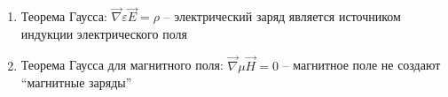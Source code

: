 \documentclass[12pt]{article}
\begin{document}
\begin{enumerate}[label*=\arabic** ]
\begin{enumerate}
            \item Теорема Гаусса: $\vec\nabla \varepsilon \vec{E} = \rho$ -- электрический заряд является источником индукции электрического поля

            \item Теорема Гаусса для магнитного поля: $\vec\nabla \mu \vec{H} = 0$ -- магнитное поле не создают \enquote{магнитные заряды}
        \end{enumerate}
    \end{enumerate}
\end{document}
